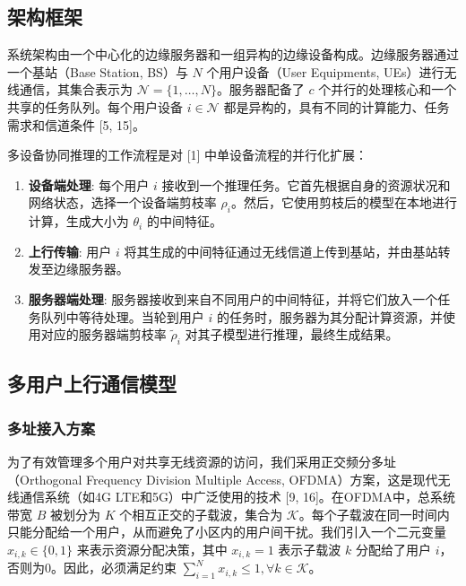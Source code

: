 \documentclass[11pt, a4paper]{article}
\begin{document}
\subsection{架构框架}

系统架构由一个中心化的边缘服务器和一组异构的边缘设备构成。边缘服务器通过一个基站（Base Station, BS）与 $N$ 个用户设备（User Equipments, UEs）进行无线通信，其集合表示为 $\mathcal{N} = \{1, \dots, N\}$。服务器配备了 $c$ 个并行的处理核心和一个共享的任务队列。每个用户设备 $i \in \mathcal{N}$ 都是异构的，具有不同的计算能力、任务需求和信道条件 [5, 15]。

多设备协同推理的工作流程是对 [1] 中单设备流程的并行化扩展：

\begin{enumerate}
\item \textbf{设备端处理}: 每个用户 $i$ 接收到一个推理任务。它首先根据自身的资源状况和网络状态，选择一个设备端剪枝率 $\rho_i$。然后，它使用剪枝后的模型在本地进行计算，生成大小为 $\theta_i$ 的中间特征。

\item \textbf{上行传输}: 用户 $i$ 将其生成的中间特征通过无线信道上传到基站，并由基站转发至边缘服务器。

\item \textbf{服务器端处理}: 服务器接收到来自不同用户的中间特征，并将它们放入一个任务队列中等待处理。当轮到用户 $i$ 的任务时，服务器为其分配计算资源，并使用对应的服务器端剪枝率 $\tilde{\rho}_i$ 对其子模型进行推理，最终生成结果。
\end{enumerate}

\subsection{多用户上行通信模型}

\subsubsection{多址接入方案}

为了有效管理多个用户对共享无线资源的访问，我们采用正交频分多址（Orthogonal Frequency Division Multiple Access, OFDMA）方案，这是现代无线通信系统（如4G LTE和5G）中广泛使用的技术 [9, 16]。在OFDMA中，总系统带宽 $B$ 被划分为 $K$ 个相互正交的子载波，集合为 $\mathcal{K}$。每个子载波在同一时间内只能分配给一个用户，从而避免了小区内的用户间干扰。我们引入一个二元变量 $x_{i,k} \in \{0, 1\}$ 来表示资源分配决策，其中 $x_{i,k}=1$ 表示子载波 $k$ 分配给了用户 $i$，否则为0。因此，必须满足约束 $\sum_{i=1}^N x_{i,k} \le 1, \forall k \in \mathcal{K}$。
\end{document}

